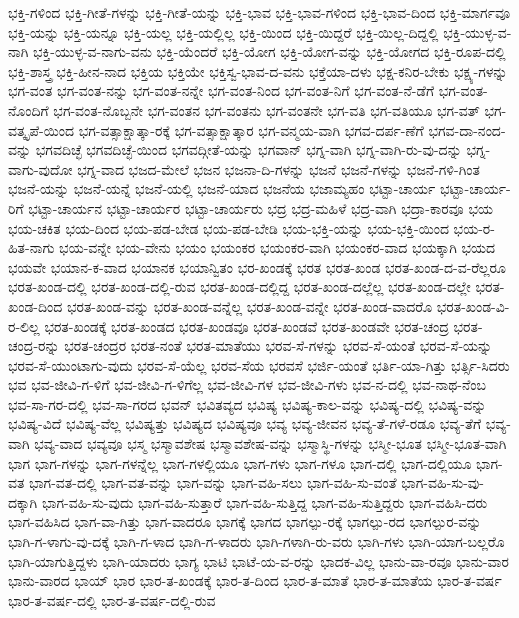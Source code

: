{ಭಕ್ತಿ-ಗಳಿಂದ
ಭಕ್ತಿ-ಗೀತೆ-ಗಳನ್ನು
ಭಕ್ತಿ-ಗೀತೆ-ಯನ್ನು
ಭಕ್ತಿ-ಭಾವ
ಭಕ್ತಿ-ಭಾವ-ಗಳಿಂದ
ಭಕ್ತಿ-ಭಾವ-ದಿಂದ
ಭಕ್ತಿ-ಮಾರ್ಗವೂ
ಭಕ್ತಿ-ಯನ್ನು
ಭಕ್ತಿ-ಯನ್ನೂ
ಭಕ್ತಿ-ಯಲ್ಲ
ಭಕ್ತಿ-ಯಲ್ಲಿಲ್ಲ
ಭಕ್ತಿ-ಯಿಂದ
ಭಕ್ತಿ-ಯಿದ್ದರೆ
ಭಕ್ತಿ-ಯಿಲ್ಲ-ದಿದ್ದಲ್ಲಿ
ಭಕ್ತಿ-ಯುಳ್ಳ-ವ-ನಾಗಿ
ಭಕ್ತಿ-ಯುಳ್ಳ-ವ-ನಾಗು-ವನು
ಭಕ್ತಿ-ಯೆಂದರೆ
ಭಕ್ತಿ-ಯೋಗ
ಭಕ್ತಿ-ಯೋಗ-ವನ್ನು
ಭಕ್ತಿ-ಯೋಗದ
ಭಕ್ತಿ-ರೂಪ-ದಲ್ಲಿ
ಭಕ್ತಿ-ಶಾಸ್ತ್ರ
ಭಕ್ತಿ-ಹೀನ-ನಾದ
ಭಕ್ತಿಯ
ಭಕ್ತಿಯೇ
ಭಕ್ತಿಸ್ವ-ಭಾವ-ದ-ವನು
ಭಕ್ತೆಯಾ-ದಳು
ಭಕ್ಷ-ಕನಿರ-ಬೇಕು
ಭಕ್ಷ್ಯ-ಗಳನ್ನು
ಭಗ-ವಂತ
ಭಗ-ವಂತ-ನನ್ನು
ಭಗ-ವಂತ-ನನ್ನೇ
ಭಗ-ವಂತ-ನಿಂದ
ಭಗ-ವಂತ-ನಿಗೆ
ಭಗ-ವಂತ-ನೆ-ಡೆಗೆ
ಭಗ-ವಂತ-ನೊಂದಿಗೆ
ಭಗ-ವಂತ-ನೊಬ್ಬನೇ
ಭಗ-ವಂತನ
ಭಗ-ವಂತನು
ಭಗ-ವಂತನೇ
ಭಗ-ವತಿ
ಭಗ-ವತಿಯೂ
ಭಗ-ವತ್
ಭಗ-ವತ್ಕೃಪೆ-ಯಿಂದ
ಭಗ-ವತ್ಸಾಕ್ಷಾತ್ಕಾ-ರಕ್ಕೆ
ಭಗ-ವತ್ಸಾಕ್ಷಾತ್ಕಾರ
ಭಗ-ವನ್ಮಯ-ವಾಗಿ
ಭಗವ-ದರ್ಪ-ಣೆಗೆ
ಭಗವ-ದಾ-ನಂದ-ವನ್ನು
ಭಗವದಿಚ್ಛೆ
ಭಗವದಿಚ್ಛೆ-ಯಿಂದ
ಭಗವದ್ಗೀತೆ-ಯನ್ನು
ಭಗವಾನ್
ಭಗ್ನ-ವಾಗಿ
ಭಗ್ನ-ವಾಗಿ-ರು-ವು-ದನ್ನು
ಭಗ್ನ-ವಾಗು-ವುದೋ
ಭಗ್ನ-ವಾದ
ಭಜದ-ಮೇಲೆ
ಭಜನ
ಭಜನಾ-ದಿ-ಗಳನ್ನು
ಭಜನೆ
ಭಜನೆ-ಗಳನ್ನು
ಭಜನೆ-ಗಳಿ-ಗಿಂತ
ಭಜನೆ-ಯನ್ನು
ಭಜನೆ-ಯನ್ನೆ
ಭಜನೆ-ಯಲ್ಲಿ
ಭಜನೆ-ಯಾದ
ಭಜನೆಯ
ಭಜಾಮ್ಯಹಂ
ಭಟ್ಟಾ-ಚಾರ್ಯ
ಭಟ್ಟಾ-ಚಾರ್ಯ-ರಿಗೆ
ಭಟ್ಟಾ-ಚಾರ್ಯನ
ಭಟ್ಟಾ-ಚಾರ್ಯರ
ಭಟ್ಟಾ-ಚಾರ್ಯರು
ಭದ್ರ
ಭದ್ರ-ಮಹಿಳೆ
ಭದ್ರ-ವಾಗಿ
ಭದ್ರಾ-ಕಾರವೂ
ಭಯ
ಭಯ-ಚಕಿತ
ಭಯ-ದಿಂದ
ಭಯ-ಪಡ-ಬೇಡ
ಭಯ-ಪಡ-ಬೇಡಿ
ಭಯ-ಭಕ್ತಿ-ಯನ್ನು
ಭಯ-ಭಕ್ತಿ-ಯಿಂದ
ಭಯ-ರ-ಹಿತ-ನಾಗು
ಭಯ-ವನ್ನೇ
ಭಯ-ವೇನು
ಭಯಂ
ಭಯಂಕರ
ಭಯಂಕರ-ವಾಗಿ
ಭಯಂಕರ-ವಾದ
ಭಯಕ್ಕಾಗಿ
ಭಯದ
ಭಯವೇ
ಭಯಾನ-ಕ-ವಾದ
ಭಯಾನಕ
ಭಯಾನ್ವಿತಂ
ಭರ-ಖಂಡಕ್ಕೆ
ಭರತ
ಭರತ-ಖಂಡ
ಭರತ-ಖಂಡ-ದ-ವ-ರೆಲ್ಲರೂ
ಭರತ-ಖಂಡ-ದಲ್ಲಿ
ಭರತ-ಖಂಡ-ದಲ್ಲಿ-ರುವ
ಭರತ-ಖಂಡ-ದಲ್ಲಿದ್ದ
ಭರತ-ಖಂಡ-ದಲ್ಲೆಲ್ಲ
ಭರತ-ಖಂಡ-ದಲ್ಲೇ
ಭರತ-ಖಂಡ-ದಿಂದ
ಭರತ-ಖಂಡ-ವನ್ನು
ಭರತ-ಖಂಡ-ವನ್ನೆಲ್ಲ
ಭರತ-ಖಂಡ-ವನ್ನೇ
ಭರತ-ಖಂಡ-ವಾದರೊ
ಭರತ-ಖಂಡ-ವಿ-ರ-ಲಿಲ್ಲ
ಭರತ-ಖಂಡಕ್ಕೆ
ಭರತ-ಖಂಡದ
ಭರತ-ಖಂಡವೂ
ಭರತ-ಖಂಡವೆ
ಭರತ-ಖಂಡವೇ
ಭರತ-ಚಂದ್ರ
ಭರತ-ಚಂದ್ರ-ರನ್ನು
ಭರತ-ಚಂದ್ರರ
ಭರತ-ನಂತೆ
ಭರತ-ಮಾತೆಯು
ಭರವ-ಸೆ-ಗಳನ್ನು
ಭರವ-ಸೆ-ಯಂತೆ
ಭರವ-ಸೆ-ಯನ್ನು
ಭರವ-ಸೆ-ಯುಂಟಾಗು-ವುದು
ಭರವ-ಸೆ-ಯೆಲ್ಲ
ಭರವ-ಸೆಯ
ಭರವಸೆ
ಭರ್ಜಿ-ಯಂತೆ
ಭರ್ತಿ-ಯಾ-ಗಿತ್ತು
ಭರ್ತ್ಸಿ-ಸಿದರು
ಭವ
ಭವ-ಜೀವಿ-ಗ-ಳಿಗೆ
ಭವ-ಜೀವಿ-ಗ-ಳಿಗೆಲ್ಲ
ಭವ-ಜೀವಿ-ಗಳ
ಭವ-ಜೀವಿ-ಗಳು
ಭವ-ನ-ದಲ್ಲಿ
ಭವ-ನಾಥ-ನೆಂಬ
ಭವ-ಸಾ-ಗರ-ದಲ್ಲಿ
ಭವ-ಸಾ-ಗರದ
ಭವನ್
ಭವಿತವ್ಯದ
ಭವಿಷ್ಯ
ಭವಿಷ್ಯ-ಕಾಲ-ವನ್ನು
ಭವಿಷ್ಯ-ದಲ್ಲಿ
ಭವಿಷ್ಯ-ವನ್ನು
ಭವಿಷ್ಯ-ವಿದೆ
ಭವಿಷ್ಯ-ವೆಲ್ಲ
ಭವಿಷ್ಯತ್ತು
ಭವಿಷ್ಯದ
ಭವಿಷ್ಯವೂ
ಭವ್ಯ
ಭವ್ಯ-ಜೀವನ
ಭವ್ಯ-ತೆ-ಗಳೆ-ರಡೂ
ಭವ್ಯ-ತೆಗೆ
ಭವ್ಯ-ವಾಗಿ
ಭವ್ಯ-ವಾದ
ಭವ್ಯವೂ
ಭಸ್ಮ
ಭಸ್ಮಾವಶೇಷ
ಭಸ್ಮಾವಶೇಷ-ವನ್ನು
ಭಸ್ಮಾಸ್ಥಿ-ಗಳನ್ನು
ಭಸ್ಮೀ-ಭೂತ
ಭಸ್ಮೀ-ಭೂತ-ವಾಗಿ
ಭಾಗ
ಭಾಗ-ಗಳನ್ನು
ಭಾಗ-ಗಳನ್ನೆಲ್ಲ
ಭಾಗ-ಗಳಲ್ಲಿಯೂ
ಭಾಗ-ಗಳು
ಭಾಗ-ಗಳೂ
ಭಾಗ-ದಲ್ಲಿ
ಭಾಗ-ದಲ್ಲಿಯೂ
ಭಾಗ-ವತ
ಭಾಗ-ವತ-ದಲ್ಲಿ
ಭಾಗ-ವತ-ವನ್ನು
ಭಾಗ-ವನ್ನು
ಭಾಗ-ವಹಿ-ಸಲು
ಭಾಗ-ವಹಿ-ಸು-ವಂತೆ
ಭಾಗ-ವಹಿ-ಸು-ವು-ದಕ್ಕಾಗಿ
ಭಾಗ-ವಹಿ-ಸು-ವುದು
ಭಾಗ-ವಹಿ-ಸುತ್ತಾರೆ
ಭಾಗ-ವಹಿ-ಸುತ್ತಿದ್ದ
ಭಾಗ-ವಹಿ-ಸುತ್ತಿದ್ದರು
ಭಾಗ-ವಹಿಸಿ-ದರು
ಭಾಗ-ವಹಿಸಿದ
ಭಾಗ-ವಾ-ಗಿತ್ತು
ಭಾಗ-ವಾದರೂ
ಭಾಗಕ್ಕೆ
ಭಾಗದ
ಭಾಗಲ್ಪು-ರಕ್ಕೆ
ಭಾಗಲ್ಪು-ರದ
ಭಾಗಲ್ಪುರ-ವನ್ನು
ಭಾಗಿ-ಗ-ಳಾಗು-ವು-ದಕ್ಕೆ
ಭಾಗಿ-ಗ-ಳಾದ
ಭಾಗಿ-ಗ-ಳಾದರು
ಭಾಗಿ-ಗಳಾಗಿ-ರು-ವರು
ಭಾಗಿ-ಗಳು
ಭಾಗಿ-ಯಾಗ-ಬಲ್ಲರೊ
ಭಾಗಿ-ಯಾಗುತ್ತಿದ್ದಳು
ಭಾಗಿ-ಯಾದರು
ಭಾಗ್ಯ
ಭಾಟಿ
ಭಾಟೆ-ಯ-ವ-ರನ್ನು
ಭಾದಕ-ವಿಲ್ಲ
ಭಾನು-ವಾ-ರವೂ
ಭಾನು-ವಾರ
ಭಾನು-ವಾರದ
ಭಾಯ್
ಭಾರ
ಭಾರ-ತ-ಖಂಡಕ್ಕೆ
ಭಾರ-ತ-ದಿಂದ
ಭಾರ-ತ-ಮಾತೆ
ಭಾರ-ತ-ಮಾತೆಯ
ಭಾರ-ತ-ವರ್ಷ
ಭಾರ-ತ-ವರ್ಷ-ದಲ್ಲಿ
ಭಾರ-ತ-ವರ್ಷ-ದಲ್ಲಿ-ರುವ
}
